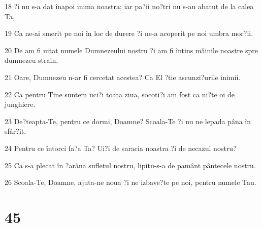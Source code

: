 \par 18 ?i nu s-a dat înapoi inima noastra; iar pa?ii no?tri nu s-au abatut de la calea Ta,
\par 19 Ca ne-ai smerit pe noi în loc de durere ?i ne-a acoperit pe noi umbra mor?ii.
\par 20 De am fi uitat numele Dumnezeului nostru ?i am fi întins mâinile noastre spre dumnezeu strain,
\par 21 Oare, Dumnezeu n-ar fi cercetat acestea? Ca El ?tie ascunzi?urile inimii.
\par 22 Ca pentru Tine suntem uci?i toata ziua, socoti?i am fost ca ni?te oi de junghiere.
\par 23 De?teapta-Te, pentru ce dormi, Doamne? Scoala-Te ?i nu ne lepada pâna în sfâr?it.
\par 24 Pentru ce întorci fa?a Ta? Ui?i de saracia noastra ?i de necazul nostru?
\par 25 Ca s-a plecat în ?arâna sufletul nostru, lipitu-s-a de pamânt pântecele nostru.
\par 26 Scoala-Te, Doamne, ajuta-ne noua ?i ne izbave?te pe noi, pentru numele Tau.

\chapter{45}

